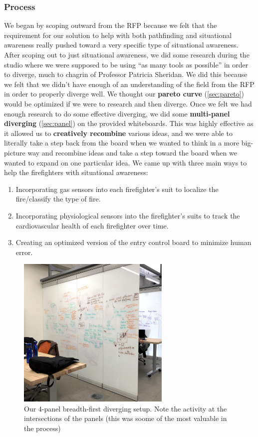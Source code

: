 \documentclass[a4paper,12pt]{article}
\begin{document}
\subsubsection{Process}
We began by scoping outward from the RFP because we felt that the requirement for our solution to help with both pathfinding and situational awareness really pushed toward a very specific type of situational awareness. After scoping out to just situational awareness, we did some research during the studio where we were supposed to be using “as many tools as possible” in order to diverge, much to chagrin of Professor Patricia Sheridan. We did this because we felt that we didn’t have enough of an understanding of the field from the RFP in order to properly diverge well. We thought our \textbf{pareto curve} (\ref{sec:pareto}) would be optimized if we were to research and then diverge. Once we felt we had enough research to do some effective diverging, we did some \textbf{multi-panel diverging} (\ref{sec:panel}) on the provided whiteboards. This was highly effective as it allowed us to \textbf{creatively recombine} various ideas, and we were able to literally take a step back from the board when we wanted to think in a more big-picture way and recombine ideas and take a step toward the board when we wanted to expand on one particular idea. We came up with three main ways to help the firefighters with situational awareness:

\begin{enumerate}
	\item Incorporating gas sensors into each firefighter’s suit to localize the fire/classify the type of fire.
	\item Incorporating physiological sensors into the firefighter’s suits to track the cardiovascular health of each firefighter over time. 
	\item Creating an optimized version of the entry control board to minimize human error.
\end{enumerate}

\begin{figure}[H]
\centering
\includegraphics[width=0.65\textwidth]{img/image014.png}
\caption{Our 4-panel breadth-first diverging setup. Note the activity at the intersections of the panels (this was soome of the most valuable in the process)}
\label{}
\end{figure}
\end{document}
